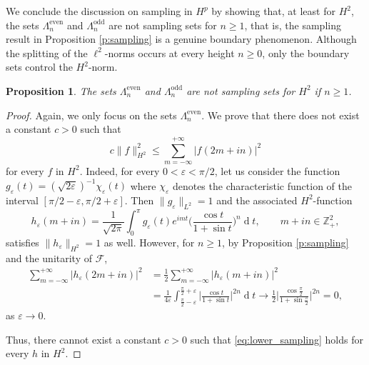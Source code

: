 \documentclass[12pt,a4paper,reqno]{amsart}
\newtheorem{prop}[thm]{Proposition}
\theoremstyle{definition}
\theoremstyle{definition}\newtheorem{defn}[thm]{Definition}
\begin{document}
    
    We conclude the discussion on sampling in $H^p$ by showing that, at least for $H^2$, the sets  $\Lambda^{\operatorname{even}}_n$ and $\Lambda^{\operatorname{odd}}_n$ are not sampling sets for $n\geqslant1$, that is, the sampling result in Proposition \ref{p:sampling} is a genuine boundary phenomenon. Although the splitting of the $\ell^2$-norms occurs at every height $n\geqslant 0$, only the boundary sets control the $H^2$-norm.
    \begin{prop}\label{p:not_sampling_positive_height}
    The sets $\Lambda^{\operatorname{even}}_n$ and $\Lambda^{\operatorname{odd}}_n$ are not sampling sets for $H^2$ if $n\geqslant 1$. 
    \end{prop}
    \begin{proof}
     Again, we only focus on the sets $\Lambda^{\operatorname{even}}_n$. We prove that there does not exist a constant $c>0$ such that 
     \begin{equation}\label{eq:lower_sampling}
     c\|f\|^2_{H^2}\leqslant \sum_{m=-\infty}^{+\infty}|f(2m+in)|^2
     \end{equation}
     for every $f$ in $H^2$. Indeed, for every $0<\varepsilon<\pi/2$, let us consider the function $g_{\varepsilon}(t)=(\sqrt{ 2\varepsilon})^{-1} \chi_{\varepsilon}(t)$ where $\chi_\varepsilon$ denotes the characteristic function of the interval $[\pi/2-\varepsilon,\pi/2+\varepsilon]$. Then $\|g_\varepsilon\|_{L^2}=1$ and the associated $H^2$-function
     \[
     h_\varepsilon(m+in)=\frac{1}{\sqrt{2\pi}} \int_0^\pi g_\varepsilon(t) e^{imt}\Big(\frac{\cos t}{1+\sin t}\Big)^n\operatorname{d}\!t, \qquad m+in\in\mathbb{Z}^2_+,
     \]
     satisfies $\|h_\varepsilon\|_{H^2}=1$ as well. However, for $n\geqslant1$, by Proposition \ref{p:sampling} and the unitarity of $\mathcal{F}$,
     \begin{align*}
         \sum_{m=-\infty}^{+\infty}|h_\varepsilon(2m+in)|^2&=\frac12\sum_{m=-\infty}^{+\infty}|h_\varepsilon(m+in)|^2\\
         &=%
         \frac{1}{4\varepsilon}\int_{\frac\pi2-\varepsilon}^{\frac\pi2+\varepsilon}\Big|\frac{\cos t}{1+\sin t}\Big|^{2n}\operatorname{d}\! t\to \frac{1}{2}\Big|\frac{\cos \frac\pi2}{1+\sin \frac\pi2}\Big|^{2n}=0,
     \end{align*}
     as $\varepsilon\to 0$.

     Thus, there cannot exist a constant $c>0$ such that \eqref{eq:lower_sampling} holds for every $h$ in $H^2$.
     \end{proof}
\end{document}
